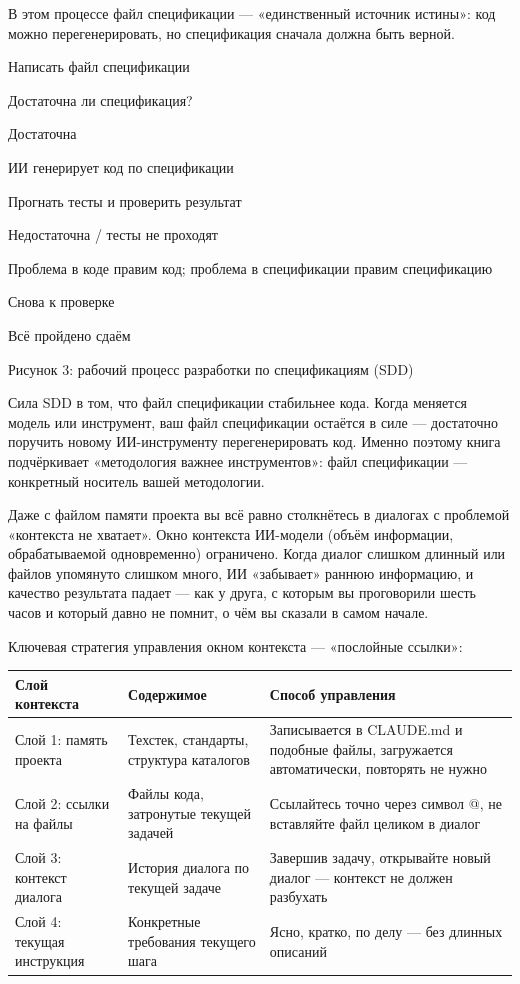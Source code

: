 В этом процессе файл спецификации — «единственный источник истины»: код можно перегенерировать, но спецификация сначала должна быть верной.

Написать файл спецификации

Достаточна ли спецификация?

Достаточна

ИИ генерирует код по спецификации

Прогнать тесты и проверить результат

Недостаточна / тесты не проходят

Проблема в коде правим код; проблема в спецификации правим спецификацию

Снова к проверке

Всё пройдено сдаём

\begin{center}\small\color{gray}Рисунок 3: рабочий процесс разработки по спецификациям (SDD)\end{center}

Сила SDD в том, что файл спецификации стабильнее кода. Когда меняется модель или инструмент, ваш файл спецификации остаётся в силе — достаточно поручить новому ИИ-инструменту перегенерировать код. Именно поэтому книга подчёркивает «методология важнее инструментов»: файл спецификации — конкретный носитель вашей методологии.


Даже с файлом памяти проекта вы всё равно столкнётесь в диалогах с проблемой «контекста не хватает». Окно контекста ИИ-модели (объём информации, обрабатываемой одновременно) ограничено. Когда диалог слишком длинный или файлов упомянуто слишком много, ИИ «забывает» раннюю информацию, и качество результата падает — как у друга, с которым вы проговорили шесть часов и который давно не помнит, о чём вы сказали в самом начале.

Ключевая стратегия управления окном контекста — «послойные ссылки»:

\begin{center}
\begin{tabularx}{\linewidth}{|X|X|X|}
\hline
\textbf{Слой контекста} & \textbf{Содержимое} & \textbf{Способ управления} \tabularnewline
\hline
Слой 1: память проекта & Техстек, стандарты, структура каталогов & Записывается в CLAUDE.md и подобные файлы, загружается автоматически, повторять не нужно \tabularnewline
Слой 2: ссылки на файлы & Файлы кода, затронутые текущей задачей & Ссылайтесь точно через символ @, не вставляйте файл целиком в диалог \tabularnewline
Слой 3: контекст диалога & История диалога по текущей задаче & Завершив задачу, открывайте новый диалог — контекст не должен разбухать \tabularnewline
Слой 4: текущая инструкция & Конкретные требования текущего шага & Ясно, кратко, по делу — без длинных описаний \tabularnewline
\hline
\end{tabularx}
\end{center}

